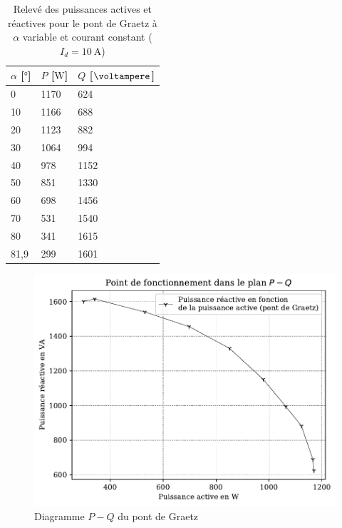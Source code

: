 \documentclass[a4paper, 11pt, openany, oneside, french]{article}
\begin{document}
\begin{table}[!ht]
\centering
\begin{tabular}{lll}
\toprule
$\alpha$ [$\si{\degree}$] & $P$ [$\si{\watt}$] & $Q$ [$\si{\voltampere}$] \\ \midrule
0                         & 1170               & 624                      \\
10                        & 1166               & 688                      \\
20                        & 1123               & 882                      \\
30                        & 1064               & 994                      \\
40                        & 978                & 1152                     \\
50                        & 851                & 1330                     \\
60                        & 698                & 1456                     \\
70                        & 531                & 1540                     \\
80                        & 341                & 1615                     \\
81,9                      & 299                & 1601                     \\ \bottomrule
\end{tabular}
\caption{Relevé des puissances actives et réactives pour le pont de Graetz à $\alpha$ variable et courant constant ($I_d=\SI{10}{\ampere}$)}
\end{table}

\begin{figure}[!ht]
    \centering
    \includegraphics[width=0.8\linewidth]{exp1_graph14}
    \caption{Diagramme $P-Q$ du pont de Graetz}
    \label{fig:exp1grap14}
\end{figure}
\end{document}
